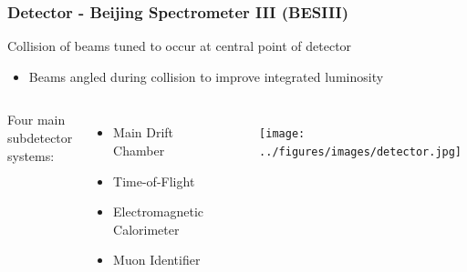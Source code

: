 \documentclass[t]{beamer}
\newcommand{\addframe}[2]{
\begin{frame}
\frametitle{#1}
#2
\end{frame}
}
\newcommand{\additem}[1]{
\begin{itemize}
\item #1
\end{itemize}
}
\begin{document}
\addframe{Detector - Beijing Spectrometer III (BESIII)}{
Collision of beams tuned to occur at central point of detector
\additem{Beams angled during collision to improve integrated luminosity}

\vspace{-0.3cm}

\begin{columns}

\column{.5\textwidth} %

Four main subdetector systems:
\begin{itemize}
\item Main Drift Chamber
\item Time-of-Flight
\item Electromagnetic Calorimeter
\item Muon Identifier 
\end{itemize}

\vspace{-0.3cm}

\begin{figure}
\texttt{[image: ../figures/images/detector.jpg]}
\end{figure}

\column{.5\textwidth} %

\begin{figure}
\includegraphics[width=\linewidth]{../figures/images/detector.pdf}
\end{figure}

\end{columns}

}
\end{document}
